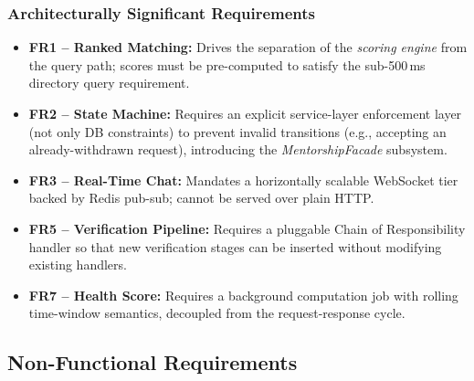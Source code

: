 \documentclass[12pt,a4paper]{article}
\begin{document}
\subsubsection{Architecturally Significant Requirements}

\begin{itemize}[leftmargin=*]
  \item \textbf{FR1 -- Ranked Matching:} Drives the separation of the \textit{scoring engine} from the query path; scores must be pre-computed to satisfy the sub-500\,ms directory query requirement.
  \item \textbf{FR2 -- State Machine:} Requires an explicit service-layer enforcement layer (not only DB constraints) to prevent invalid transitions (e.g., accepting an already-withdrawn request), introducing the \textit{MentorshipFacade} subsystem.
  \item \textbf{FR3 -- Real-Time Chat:} Mandates a horizontally scalable WebSocket tier backed by Redis pub-sub; cannot be served over plain HTTP.
  \item \textbf{FR5 -- Verification Pipeline:} Requires a pluggable Chain of Responsibility handler so that new verification stages can be inserted without modifying existing handlers.
  \item \textbf{FR7 -- Health Score:} Requires a background computation job with rolling time-window semantics, decoupled from the request-response cycle.
\end{itemize}

\subsection{Non-Functional Requirements}
\end{document}
